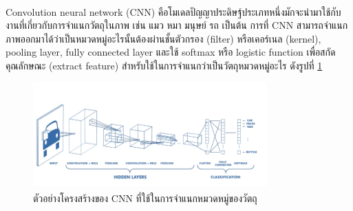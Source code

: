Convolution neural network (CNN)\textsuperscript{\cite{cnn}} คือโมเดลปัญญาประดิษฐ์ประเภทหนึ่งมักจะนำมาใช้กับงานที่เกี่ยวกับการจำแนกวัตถุในภาพ เช่น แมว หมา มนุษย์ รถ เป็นต้น
การที่ CNN สามารถจำแนกภาพออกมาได้ว่าเป็นหมวดหมู่อะไรนั้นต้องผ่านชั้นตัวกรอง (filter) หรือเคอร์เนล (kernel), pooling layer, fully connected layer 
และใช้ softmax หรือ logistic function เพื่อสกัดคุณลักษณะ (extract feature) สำหรับใช้ในการจำแนกว่าเป็นวัตถุหมวดหมู่อะไร ดังรูปที่ \ref{fig:CNN architecture}

\begin{figure}[!ht]
	\centering
	\includegraphics[width=0.8\textwidth]{chapter2/images/CNN.png}
		\caption[ตัวอย่างโครงสร้างของ CNN ที่ใช้ในการจำแนกหมวดหมู่ของวัตถุ]{ตัวอย่างโครงสร้างของ CNN ที่ใช้ในการจำแนกหมวดหมู่ของวัตถุ\textsuperscript{\cite{cnn}}}
    	\label{fig:CNN architecture}
\end{figure}


